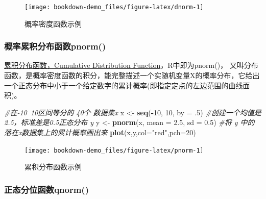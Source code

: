 \documentclass[
]{article}
\newenvironment{Shaded}{\begin{snugshade}}{\end{snugshade}}
\newcommand{\CommentTok}[1]{\textcolor[rgb]{0.56,0.35,0.01}{\textit{#1}}}
\newcommand{\DataTypeTok}[1]{\textcolor[rgb]{0.13,0.29,0.53}{#1}}
\newcommand{\DecValTok}[1]{\textcolor[rgb]{0.00,0.00,0.81}{#1}}
\newcommand{\FloatTok}[1]{\textcolor[rgb]{0.00,0.00,0.81}{#1}}
\newcommand{\KeywordTok}[1]{\textcolor[rgb]{0.13,0.29,0.53}{\textbf{#1}}}
\newcommand{\NormalTok}[1]{#1}
\newcommand{\OperatorTok}[1]{\textcolor[rgb]{0.81,0.36,0.00}{\textbf{#1}}}
\newcommand{\StringTok}[1]{\textcolor[rgb]{0.31,0.60,0.02}{#1}}
\begin{document}
\begin{figure}

{\centering \texttt{[image: bookdown-demo\_files/figure-latex/dnorm-1]} 

}

\caption{概率密度函数示例}\label{fig:dnorm}
\end{figure}

\hypertarget{ux6982ux7387ux7d2fux79efux5206ux5e03ux51fdux6570pnorm}{%
\subsubsection{概率累积分布函数pnorm()}\label{ux6982ux7387ux7d2fux79efux5206ux5e03ux51fdux6570pnorm}}

\href{https://zh.wikipedia.org/wiki/\%E7\%B4\%AF\%E7\%A7\%AF\%E5\%88\%86\%E5\%B8\%83\%E5\%87\%BD\%E6\%95\%B0}{累积分布函数，Cumulative Distribution Function}，R中即为pnorm()，
又叫分布函数，是概率密度函数的积分，能完整描述一个实随机变量X的概率分布，它给出一个正态分布中小于一个给定数字的累计概率(即指定定点的左边范围的曲线面积)。

\begin{Shaded}
\begin{Highlighting}[]
\CommentTok{#在-10~10区间等分的 40个 数据集x}
\NormalTok{x <-}\StringTok{ }\KeywordTok{seq}\NormalTok{(}\OperatorTok{-}\DecValTok{10}\NormalTok{, }\DecValTok{10}\NormalTok{, }\DataTypeTok{by =} \FloatTok{.5}\NormalTok{)}
\CommentTok{#创建一个均值是2.5，标准差是0.5正态分布 y}
\NormalTok{y <-}\StringTok{ }\KeywordTok{pnorm}\NormalTok{(x, }\DataTypeTok{mean =} \FloatTok{2.5}\NormalTok{, }\DataTypeTok{sd =} \FloatTok{0.5}\NormalTok{)}
\CommentTok{#将 y 中的落在x数据集上的累计概率画出来}
\KeywordTok{plot}\NormalTok{(x,y,}\DataTypeTok{col=}\StringTok{"red"}\NormalTok{,}\DataTypeTok{pch=}\DecValTok{20}\NormalTok{)}
\end{Highlighting}
\end{Shaded}

\begin{figure}

{\centering \texttt{[image: bookdown-demo\_files/figure-latex/pnorm-1]} 

}

\caption{累积分布函数示例}\label{fig:pnorm}
\end{figure}

\hypertarget{ux6b63ux6001ux5206ux4f4dux51fdux6570qnorm}{%
\subsubsection{正态分位函数qnorm()}\label{ux6b63ux6001ux5206ux4f4dux51fdux6570qnorm}}
\end{document}

